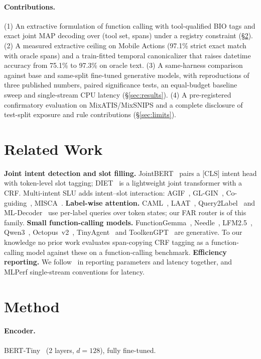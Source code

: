 \documentclass[11pt]{article}
\begin{document}
\paragraph{Contributions.}
(1) An extractive formulation of function calling with tool-qualified BIO tags and exact joint MAP
decoding over (tool set, spans) under a registry constraint (\S\ref{sec:method}).
(2) A measured extractive ceiling on Mobile Actions (97.1\% strict exact match with oracle spans) and a
train-fitted temporal canonicalizer that raises datetime accuracy from 75.1\% to 97.3\% on oracle text.
(3) A same-harness comparison against base and same-split fine-tuned generative models, with
reproductions of three published numbers, paired significance tests, an equal-budget baseline sweep and
single-stream CPU latency (\S\ref{sec:results}).
(4) A pre-registered confirmatory evaluation on MixATIS/MixSNIPS and a complete disclosure of
test-split exposure and rule contributions (\S\ref{sec:limits}).

\section{Related Work}
\textbf{Joint intent detection and slot filling.} JointBERT~\cite{jointbert} pairs a [CLS] intent head
with token-level slot tagging; DIET~\cite{diet} is a lightweight joint transformer with a CRF.
Multi-intent SLU adds intent--slot interaction: AGIF~\cite{agif}, GL-GIN~\cite{glgin},
Co-guiding~\cite{coguiding}, MISCA~\cite{misca}.
\textbf{Label-wise attention.} CAML~\cite{caml}, LAAT~\cite{laat}, Query2Label~\cite{query2label} and
ML-Decoder~\cite{mldecoder} use per-label queries over token states; our FAR router is of this family.
\textbf{Small function-calling models.} FunctionGemma~\cite{functiongemma}, Needle~\cite{needle},
LFM2.5~\cite{lfm25}, Qwen3~\cite{qwen3}, Octopus~v2~\cite{octopus}, TinyAgent~\cite{tinyagent} and
ToolkenGPT~\cite{toolkengpt} are generative. To our knowledge no prior work evaluates span-copying
CRF tagging as a function-calling model against these on a function-calling benchmark.
\textbf{Efficiency reporting.} We follow~\cite{effmisnomer} in reporting parameters and latency
together, and MLPerf single-stream conventions for latency.

\section{Method}\label{sec:method}
\paragraph{Encoder.} BERT-Tiny~\cite{berttiny} (2 layers, $d{=}128$), fully fine-tuned.
\end{document}
